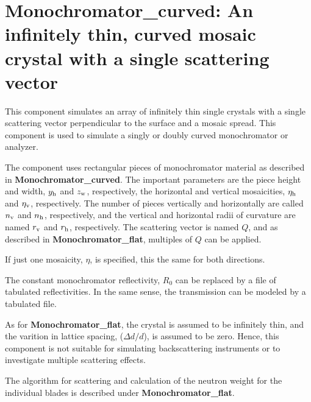 
\section{Monochromator\_curved: An infinitely thin, curved mosaic crystal with 
a single scattering vector}
\label{s:monochromator_curved}



This component simulates an array of infinitely thin single
crystals with a single scattering vector perpendicular to the
surface and a mosaic spread. 
This component is used to simulate a singly or doubly
curved monochromator or analyzer.

The component uses  rectangular pieces of monochromator material
as described in {\bf Monochromator\_curved}. 
The important parameters are the piece height and width,
$y_{\rm h}$ and $z_{\rm w}$, respectively, the
horizontal and vertical mosaicities, $\eta_{\rm h}$ and $\eta_{\rm v}$,
respectively. The number of pieces vertically and horizontally are called
$n_{\rm v}$ and $n_{\rm h}$, respectively, and the vertical and horizontal
radii of curvature are named $r_{\rm v}$ and $r_{\rm h}$, respectively.
The scattering vector is named $Q$, and as described in 
{\bf Monochromator\_flat}, multiples of $Q$ can be applied.

If just one mosaicity, $\eta$, is specified, this the same for 
both directions.

The constant monochromator reflectivity, $R_0$ can be replaced by
a file of tabulated reflectivities. In the same sense, the transmission
can be modeled by a tabulated file. 

As for {\bf Monochromator\_flat}, the crystal is assumed to be infinitely
thin, and the varition in lattice spacing, ($\Delta d/d$), 
is assumed to be zero. Hence, this
component is not suitable for simulating backscattering instruments or to
investigate multiple scattering effects.

The algorithm for scattering and calculation of the neutron weight for
the individual blades is described under {\bf Monochromator\_flat}.